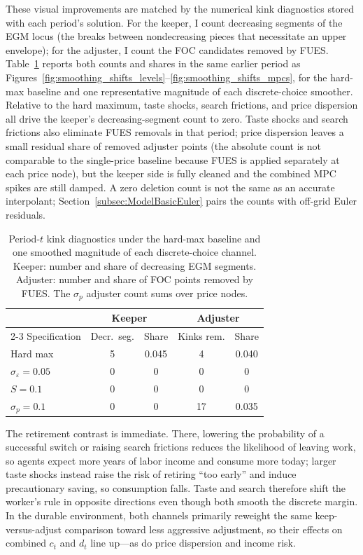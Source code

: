 These visual improvements are matched by the numerical kink diagnostics stored with each period's solution. For the keeper, I count decreasing segments of the EGM locus (the breaks between nondecreasing pieces that necessitate an upper envelope); for the adjuster, I count the FOC candidates removed by FUES. Table~\ref{tab:smoothing_kinks} reports both counts and shares in the same earlier period as Figures~\ref{fig:smoothing_shifts_levels}--\ref{fig:smoothing_shifts_mpcs}, for the hard-max baseline and one representative magnitude of each discrete-choice smoother. Relative to the hard maximum, taste shocks, search frictions, and price dispersion all drive the keeper's decreasing-segment count to zero. Taste shocks and search frictions also eliminate FUES removals in that period; price dispersion leaves a small residual share of removed adjuster points (the absolute count is not comparable to the single-price baseline because FUES is applied separately at each price node), but the keeper side is fully cleaned and the combined MPC spikes are still damped. A zero deletion count is not the same as an accurate interpolant; Section~\ref{subsec:ModelBasicEuler} pairs the counts with off-grid Euler residuals.

\begin{table}[htbp]
\centering
\caption{Period-$t$ kink diagnostics under the hard-max baseline and one smoothed magnitude of each discrete-choice channel. Keeper: number and share of decreasing EGM segments. Adjuster: number and share of FOC points removed by FUES. The $\sigma_p$ adjuster count sums over price nodes.}
\label{tab:smoothing_kinks}
\begin{tabular}{lcccc}
\hline
 & \multicolumn{2}{c}{Keeper} & \multicolumn{2}{c}{Adjuster} \\
\cline{2-3}\cline{4-5}
Specification & Decr.\ seg. & Share & Kinks rem. & Share \\
\hline
Hard max & 5 & 0.045 & 4 & 0.040 \\
$\sigma_\varepsilon = 0.05$ & 0 & 0 & 0 & 0 \\
$S = 0.1$ & 0 & 0 & 0 & 0 \\
$\sigma_p = 0.1$ & 0 & 0 & 17 & 0.035 \\
\hline
\end{tabular}
\end{table}

The retirement contrast is immediate. There, lowering the probability of a successful switch or raising search frictions reduces the likelihood of leaving work, so agents expect more years of labor income and consume more today; larger taste shocks instead raise the risk of retiring ``too early'' and induce precautionary saving, so consumption falls. Taste and search therefore shift the worker's rule in opposite directions even though both smooth the discrete margin. In the durable environment, both channels primarily reweight the same keep-versus-adjust comparison toward less aggressive adjustment, so their effects on combined $c_t$ and $d_t$ line up---as do price dispersion and income risk.

